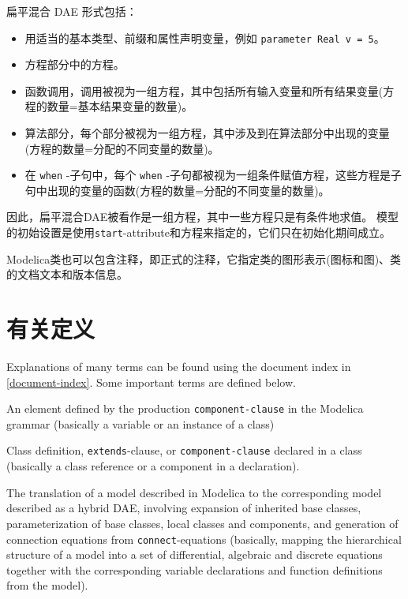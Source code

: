 扁平混合 DAE 形式包括：
\begin{itemize}
\item
  用适当的基本类型、前缀和属性声明变量，例如 \lstinline!parameter Real v = 5!。
\item
  方程部分中的方程。
\item
  函数调用，调用被视为一组方程，其中包括所有输入变量和所有结果变量(方程的数量=基本结果变量的数量)。
\item
  算法部分，每个部分被视为一组方程，其中涉及到在算法部分中出现的变量(方程的数量=分配的不同变量的数量)。
\item
  在 \lstinline!when! -子句中，每个 \lstinline!when! -子句都被视为一组条件赋值方程，这些方程是子句中出现的变量的函数(方程的数量=分配的不同变量的数量)。
\end{itemize}

因此，扁平混合DAE被看作是一组方程，其中一些方程只是有条件地求值。
模型的初始设置是使用\lstinline!start!-attribute和方程来指定的，它们只在初始化期间成立。

Modelica类也可以包含注释，即正式的注释，它指定类的图形表示(图标和图)、类的文档文本和版本信息。

\section{有关定义}\label{some-definitions}

Explanations of many terms can be found using the document index in \cref{document-index}.
Some important terms are defined below.

\begin{definition}[Component]
An element defined by the production \lstinline[language=grammar]!component-clause! in the Modelica grammar (basically a variable or an instance of a class)
\end{definition}

\begin{definition}[Element]
Class definition, \lstinline!extends!-clause, or \lstinline[language=grammar]!component-clause! declared in a class (basically a class reference or a component in a declaration).
\end{definition}

\begin{definition}[Flattening]
The translation of a model described in Modelica to the corresponding model described as a hybrid DAE, involving expansion of inherited base classes, parameterization of base classes, local classes
and components, and generation of connection equations from \lstinline!connect!-equations (basically, mapping the hierarchical structure of a model into a set of differential, algebraic and discrete equations together with the corresponding variable declarations and function definitions from the model).
\end{definition}

